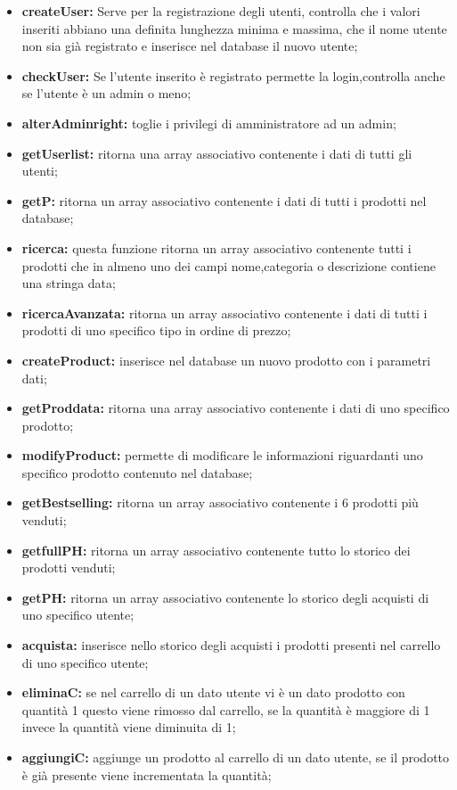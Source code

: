 \begin{itemize}
	\item \textbf{createUser:} Serve per la registrazione degli utenti, controlla che i valori inseriti abbiano una definita lunghezza minima e massima, che il nome utente non sia già registrato e inserisce nel database il nuovo utente;
	\item \textbf{checkUser:} Se l'utente inserito è registrato permette la login,controlla anche se l'utente è un admin o meno;
	\item \textbf{alterAdminright:} toglie i privilegi di amministratore ad un admin;
	\item \textbf{getUserlist:} ritorna una array associativo contenente i dati di tutti gli utenti;
	\item \textbf{getP:} ritorna un array associativo contenente i dati di tutti i prodotti nel database;
	\item \textbf{ricerca:} questa funzione ritorna un array associativo contenente tutti i prodotti che in almeno uno dei campi nome,categoria o descrizione contiene una stringa data; 
	\item \textbf{ricercaAvanzata:} ritorna un array associativo contenente i dati di tutti i prodotti di uno specifico tipo in ordine di prezzo;
	\item \textbf{createProduct:} inserisce nel database un nuovo prodotto con i parametri dati;
	\item \textbf{getProddata:} ritorna una array associativo contenente i dati di uno specifico prodotto;
	\item \textbf{modifyProduct:} permette di modificare le informazioni riguardanti uno specifico prodotto contenuto nel database;
	\item \textbf{getBestselling:} ritorna un array associativo contenente i 6 prodotti più venduti; 
	\item \textbf{getfullPH:} ritorna un array associativo contenente tutto lo storico dei prodotti venduti;
	\item \textbf{getPH:} ritorna un array associativo contenente lo storico degli acquisti di uno specifico utente;
	\item \textbf{acquista:} inserisce nello storico degli acquisti i prodotti presenti nel carrello di uno specifico utente;
	\item \textbf{eliminaC:} se nel carrello di un dato utente vi è un dato prodotto con quantità 1 questo viene rimosso dal carrello, se la quantità è maggiore di 1 invece la quantità viene diminuita di 1;
	\item \textbf{aggiungiC:} aggiunge un prodotto al carrello di un dato utente, se il prodotto è già presente viene incrementata la quantità;

\end{itemize}
